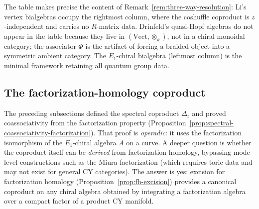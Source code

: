 \begin{remark}
The table makes precise the content of
Remark~\ref{rem:three-way-resolution}:
Li's vertex bialgebras occupy the rightmost column, where
the coshuffle coproduct is $z$-independent and carries no $R$-matrix
data.
Drinfeld's quasi-Hopf algebras do not appear in the table because
they live in $(\mathrm{Vect}, \otimes_k)$, not in a chiral monoidal
category; the associator $\Phi$ is the artifact of forcing a braided
object into a symmetric ambient category.
The $E_1$-chiral bialgebra (leftmost column) is the minimal
framework retaining all quantum group data.
\end{remark}

\subsection{The factorization-homology coproduct}
\label{subsec:fact-hom-coproduct}

The preceding subsections defined the spectral coproduct $\Delta_z$ and
proved coassociativity from the factorization property
(Proposition~\ref{prop:spectral-coassociativity-factorization}). That
proof is \emph{operadic}: it uses the factorization isomorphism of the
$E_1$-chiral algebra $A$ on a curve. A deeper question is whether the
coproduct itself can be \emph{derived} from factorization homology,
bypassing mode-level constructions such as the Miura factorization
(which requires toric data and may not exist for general CY categories).
The answer is yes: excision for factorization homology
(Proposition~\ref{prop:fh-excision}) provides a canonical coproduct on
any chiral algebra obtained by integrating a factorization algebra over
a compact factor of a product CY manifold.

